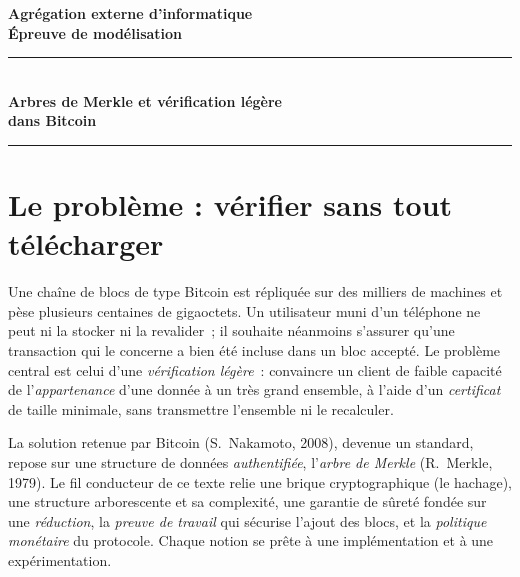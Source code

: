 \documentclass[11pt,a4paper]{article}
\theoremstyle{definition}\newtheorem{definition}{Définition}
\theoremstyle{plain}\newtheorem{theoreme}{Théorème}\newtheorem{proposition}{Proposition}
\theoremstyle{remark}\newtheorem{remarque}{Remarque}
\begin{document}
\begin{center}
{\large\bfseries Agrégation externe d'informatique}\\[3pt]
{\bfseries Épreuve de modélisation}\\[10pt]
\rule{0.85\linewidth}{0.4pt}\\[8pt]
{\LARGE\bfseries Arbres de Merkle et vérification légère\\[2pt] dans Bitcoin}\\[8pt]
\rule{0.85\linewidth}{0.4pt}
\end{center}

\medskip
\begin{center}
\end{center}

\bigskip
\section{Le problème : vérifier sans tout télécharger}

Une chaîne de blocs de type Bitcoin est répliquée sur des milliers de machines et pèse plusieurs
centaines de gigaoctets. Un utilisateur muni d'un téléphone ne peut ni la stocker ni la
revalider~; il souhaite néanmoins s'assurer qu'une transaction qui le concerne a bien été incluse
dans un bloc accepté. Le problème central est celui d'une \emph{vérification légère}~: convaincre
un client de faible capacité de l'\emph{appartenance} d'une donnée à un très grand ensemble, à
l'aide d'un \emph{certificat} de taille minimale, sans transmettre l'ensemble ni le recalculer.

La solution retenue par Bitcoin (S.~Nakamoto, 2008), devenue un standard, repose sur une structure
de données \emph{authentifiée}, l'\emph{arbre de Merkle} (R.~Merkle, 1979). Le fil conducteur de
ce texte relie une brique cryptographique (le hachage), une structure arborescente et sa
complexité, une garantie de sûreté fondée sur une \emph{réduction}, la \emph{preuve de travail}
qui sécurise l'ajout des blocs, et la \emph{politique monétaire} du protocole. Chaque notion se
prête à une implémentation et à une expérimentation.
\end{document}
